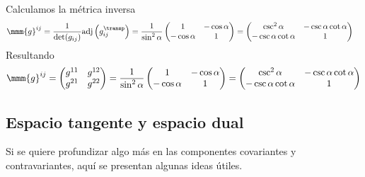 Calculamos la métrica inversa
{\small
  \begin{align*}
    \mmm{g}^{ij}
    &=
      \dfrac{1}{\det(g_{ij})}
      \text{adj}\left(g_{ij}^\transp\right)
      = \dfrac{1}{\sin^2\alpha}
      \begin{pmatrix}
        1 & -\cos\alpha\\
        -\cos\alpha & 1
      \end{pmatrix}
      = \begin{pmatrix}
        \csc^2\alpha & -\csc\alpha\cot\alpha\\
        -\csc\alpha\cot\alpha & 1
      \end{pmatrix}
  \end{align*}
}
Resultando
{\small
\begin{equation}\label{eq:R2-oblic_metrica_inv}
  \mmm{g}^{ij}
  = \begin{pmatrix}
    g^{11} & g^{12}\\
    g^{21} & g^{22}
  \end{pmatrix}
  = \dfrac{1}{\sin^2\alpha}
  \begin{pmatrix}
    1 & -\cos\alpha\\
    -\cos\alpha & 1
  \end{pmatrix}
  = \begin{pmatrix}
    \csc^2\alpha & -\csc\alpha\cot\alpha\\
    -\csc\alpha\cot\alpha & 1
  \end{pmatrix}
\end{equation}
}

\subsection{Espacio tangente y espacio dual}
Si se quiere profundizar algo más en las componentes covariantes y contravariantes, aquí
se presentan algunas ideas útiles.

